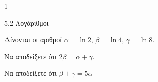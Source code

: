 \begin{ylh}{1}
\item 5.2 Λογάριθμοι
\end{ylh}
Δίνονται οι αριθμοί $\alpha = \ln 2$, $\beta = \ln 4$, $\gamma = \ln 8$.
\begin{alist}
\item Να αποδείξετε ότι $2\beta = \alpha + \gamma$.
\item Να αποδείξετε ότι $\beta + \gamma = 5\alpha$
\end{alist}

